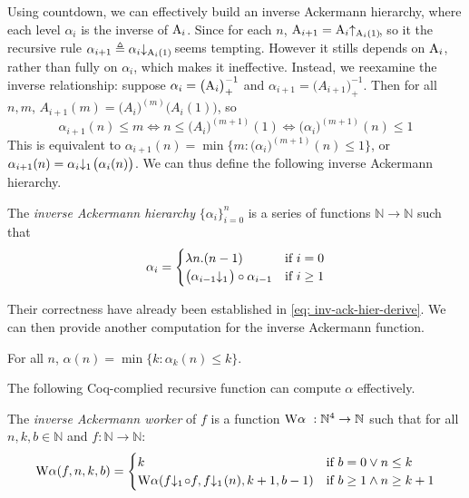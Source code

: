 Using countdown, we can effectively build an inverse Ackermann hierarchy, where each level $\alpha_i$ is the inverse of $\text{A}_i$. Since for each $n$, $\Ack_{i+1} = \rf{\Ack_i}{\Ack_i(1)}$, so it the recursive rule $\alpha_{i+1} \triangleq \cdt{\alpha_i}{\Ack_i(1)}$ seems tempting. However it stills depends on $\text{A}_i$, rather than fully on $\alpha_i$, which makes it ineffective. Instead, we reexamine the inverse relationship: suppose $\alpha_i = \big(\text{A}_i\big)^{-1}_+$ and $\alpha_{i+1} = \big(A_{i+1}\big)^{-1}_+$. Then for all $n, m$, $A_{i+1}(m) = \big(A_i\big)^{(m)}\big(A_i(1)\big)$, so
\begin{equation} \label{eq: inv-ack-hier-derive}
\alpha_{i+1}(n)\le m \iff n\le \big(A_i\big)^{(m+1)}(1) \iff \big(\alpha_i\big)^{(m+1)}(n) \le 1
\end{equation}
This is equivalent to $\alpha_{i+1}(n) = \min\big\{m : \big( \alpha_i \big)^{(m+1)}(n)\le 1\big\}$, or $\alpha_{i+1}(n) = \cdt{\alpha_i}{1}\big(\alpha_i(n)\big)$. We can thus define the following inverse Ackermann hierarchy.
\begin{defn} \label{defn: inv-ack-hier}
	The \emph{inverse Ackermann hierarchy} $\{\alpha_i\}_{i=0}^{n}$ is a series of functions $\mathbb{N}\to \mathbb{N}$ such that
\begin{equation*}
	\alpha_i = \begin{cases}
	\lambda n.(n - 1) & \text{if } i = 0
	\\ \big(\cdt{\alpha_{i-1}}{1}\big)\circ \alpha_{i-1} & \text{if } i\ge 1 \end{cases}
\end{equation*}
\end{defn}
Their correctness have already been established in \eqref{eq: inv-ack-hier-derive}. We can then provide another computation for the inverse Ackermann function.
\begin{thm} \label{thm: inv-ack-hier-correct}
	For all $n$, $\alpha(n) = \min\big\{k : \alpha_k(n)\le k \big\}$.
\end{thm}
The following Coq-complied recursive function can compute $\alpha$ effectively.
\begin{defn} \label{defn: inv-ack-worker}
	The \emph{inverse Ackermann worker} of $f$ is a function $\text{W}\alpha\ : \mathbb{N}^4\to \mathbb{N}$ such that for all $n, k, b\in \mathbb{N}$ and $f:\mathbb{N}\to \mathbb{N}$:
	\begin{equation} \label{eq: inv-ack-worker-recursion}
	\W\alpha(f, n, k, b) = \begin{cases}
	k & \text{if } b = 0 \vee n\le k \\ \W\alpha(\cdt{f}{1}\circ f , \cdt{f}{1}(n), k+1, b-1) & \text{if } b \ge 1 \wedge n \ge k+1
	\end{cases}
	\end{equation}
\end{defn}
